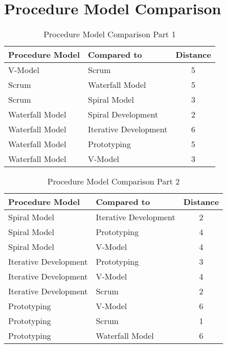 \section{Procedure Model Comparison}
\begin{table}[h]
	\centering 
	\setlength{\tabcolsep}{4pt}
	\begin{tabular}{|l|l|c|}\hline
		Procedure Model			& Compared to 	&  Distance 	\\ \hline
		V-Model&	Scrum	&5\\ \hline
		Scrum	&Waterfall Model&	5\\ \hline
		Scrum	&Spiral Model&	3\\ \hline
		Waterfall Model&	Spiral Development&	2\\ \hline
		Waterfall Model&	Iterative Development	&6\\ \hline
		Waterfall Model&Prototyping&	5\\ \hline
		Waterfall Model&	V-Model&3\\ \hline
	\end{tabular} 
	\caption{Procedure Model Comparison Part 1} 
	\label{proceduremodelcomparison} 
\end{table}

\begin{table}[h]
	\centering 
	\setlength{\tabcolsep}{4pt}
	\begin{tabular}{|l|l|c|}\hline
		Procedure Model			& Compared to 	&  Distance 	\\ \hline
		Spiral Model&	Iterative Development&	2\\ \hline
		Spiral Model&	Prototyping&	4\\ \hline
		Spiral Model&	V-Model&	4\\ \hline
		Iterative Development&	Prototyping&	3\\ \hline
		Iterative Development&	V-Model&	4\\ \hline
		Iterative Development&	Scrum	&2\\ \hline
		Prototyping&	V-Model&	6\\ \hline
		Prototyping&	Scrum&	1\\ \hline
		Prototyping&	Waterfall Model&	6\\ \hline
	\end{tabular} 
	\caption{Procedure Model Comparison Part 2} 
	\label{proceduremodelcomparison2} 
\end{table}
